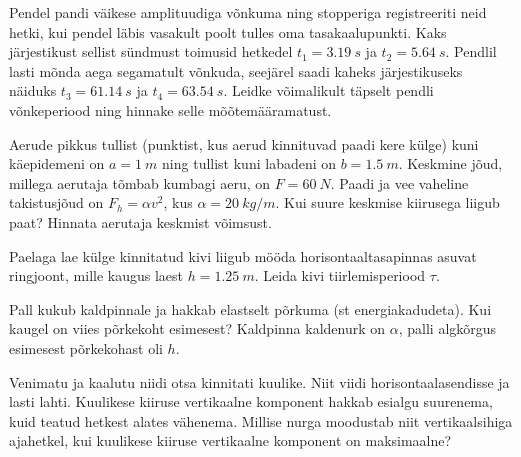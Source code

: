 \documentclass[10pt]{article}
\begin{document}
{
Pendel pandi väikese amplituudiga võnkuma ning stopperiga registreeriti neid hetki, kui pendel läbis vasakult poolt tulles oma tasakaalupunkti. Kaks järjestikust sellist sündmust toimusid hetkedel $t_1=\SI{3,19}{s}$ ja $t_2=\SI{5,64}{s}$. Pendlil lasti mõnda aega segamatult võnkuda, seejärel saadi kaheks järjestikuseks näiduks $t_3=\SI{61,14}{s}$ ja $t_4=\SI{63,54}{s}$. Leidke võimalikult täpselt pendli võnkeperiood ning hinnake selle mõõtemääramatust.
\probend
\bigskip


Aerude pikkus tullist (punktist, kus aerud kinnituvad paadi kere külge) kuni käepidemeni on $a = \SI{1}{m}$ ning tullist kuni labadeni on $b = \SI{1,5}{m}$. Keskmine jõud, millega aerutaja tõmbab kumbagi aeru, on $F = \SI{60}{N}$. Paadi ja vee vaheline takistusjõud on $F_h = \alpha v^2$, kus $\alpha = \SI{20}{kg/m}$. Kui suure keskmise kiirusega liigub paat? Hinnata aerutaja keskmist võimsust.
\probend
\bigskip


Paelaga lae külge kinnitatud kivi liigub mööda horisontaaltasapinnas asuvat ringjoont, mille kaugus laest $h = \SI{1,25}{m}$. Leida kivi tiirlemisperiood $\tau$.
\probend
\bigskip


Pall kukub kaldpinnale ja hakkab elastselt põrkuma (st energiakadudeta). Kui kaugel on viies põrkekoht esimesest? Kaldpinna kaldenurk on $\alpha$, palli algkõrgus esimesest põrkekohast oli $h$.
\probend
\bigskip


Venimatu ja kaalutu niidi otsa kinnitati kuulike.
Niit viidi horisontaalasendisse ja lasti lahti. Kuulikese kiiruse vertikaalne komponent
hakkab esialgu suurenema, kuid teatud hetkest alates vähenema. Millise nurga moodustab niit vertikaalsihiga ajahetkel, kui kuulikese kiiruse vertikaalne komponent on
maksimaalne?
\probend
\bigskip


}
\end{document}
